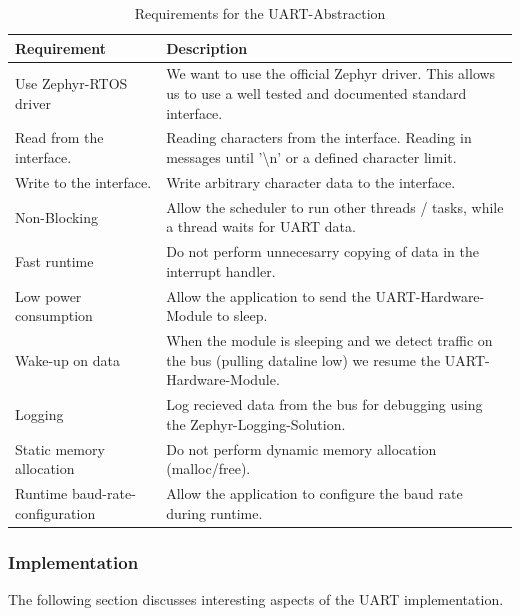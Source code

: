 \begin{table} [h!]
    \centering
    \begin{tabular}{|>{\centering\arraybackslash}p{0.3\linewidth}|>{\centering\arraybackslash}p{0.7\linewidth}|} \hline 
         Requirement& Description\\ \hline 
         Use Zephyr-RTOS driver& We want to use the official Zephyr driver. This allows us to use a well tested and documented standard interface.\\ \hline 
         Read from the interface.& Reading characters from the interface.
Reading in messages until '\textbackslash n' or a defined character limit.\\ \hline 
         Write to the interface.& Write arbitrary character data to the interface.\\ \hline 
         Non-Blocking& Allow the scheduler to run other threads / tasks, while a thread waits for UART data.\\ \hline 
         Fast runtime& Do not perform unnecesarry copying of data in the interrupt handler.\\ \hline 
 Low power consumption&Allow the application to send the UART-Hardware-Module to sleep.\\ \hline 
 Wake-up on data&When the module is sleeping and we detect traffic on the bus (pulling dataline low) we resume the UART-Hardware-Module.\\ \hline 
 Logging&Log recieved data from the bus for debugging using the Zephyr-Logging-Solution.\\ \hline 
 Static memory allocation&Do not perform dynamic memory allocation (malloc/free).\\ \hline 
 Runtime baud-rate-configuration&Allow the application to configure the baud rate during runtime.\\ \hline
    \end{tabular}
    \caption{Requirements for the UART-Abstraction}
    \label{tab:requirements_uart_interface}
\end{table}

\subsubsection{Implementation}

The following section discusses interesting aspects of the UART implementation.

